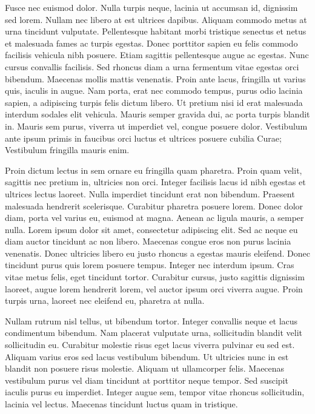 Fusce nec euismod dolor.
Nulla turpis neque, lacinia ut accumsan id, dignissim sed lorem.
Nullam nec libero at est ultrices dapibus.
Aliquam commodo metus at urna tincidunt vulputate.
Pellentesque habitant morbi tristique senectus et netus et malesuada fames ac turpis egestas.
Donec porttitor sapien eu felis commodo facilisis vehicula nibh posuere.
Etiam sagittis pellentesque augue ac egestas.
Nunc cursus convallis facilisis.
Sed rhoncus diam a urna fermentum vitae egestas orci bibendum.
Maecenas mollis mattis venenatis.
Proin ante lacus, fringilla ut varius quis, iaculis in augue.
Nam porta, erat nec commodo tempus, purus odio lacinia sapien, a adipiscing turpis felis dictum libero.
Ut pretium nisi id erat malesuada interdum sodales elit vehicula.
Mauris semper gravida dui, ac porta turpis blandit in.
Mauris sem purus, viverra ut imperdiet vel, congue posuere dolor.
Vestibulum ante ipsum primis in faucibus orci luctus et ultrices posuere cubilia Curae; Vestibulum fringilla mauris enim.

Proin dictum lectus in sem ornare eu fringilla quam pharetra.
Proin quam velit, sagittis nec pretium in, ultricies non orci.
Integer facilisis lacus id nibh egestas et ultrices lectus laoreet.
Nulla imperdiet tincidunt erat non bibendum.
Praesent malesuada hendrerit scelerisque.
Curabitur pharetra posuere lorem.
Donec dolor diam, porta vel varius eu, euismod at magna.
Aenean ac ligula mauris, a semper nulla.
Lorem ipsum dolor sit amet, consectetur adipiscing elit.
Sed ac neque eu diam auctor tincidunt ac non libero.
Maecenas congue eros non purus lacinia venenatis.
Donec ultricies libero eu justo rhoncus a egestas mauris eleifend.
Donec tincidunt purus quis lorem posuere tempus.
Integer nec interdum ipsum.
Cras vitae metus felis, eget tincidunt tortor.
Curabitur cursus, justo sagittis dignissim laoreet, augue lorem hendrerit lorem, vel auctor ipsum orci viverra augue.
Proin turpis urna, laoreet nec eleifend eu, pharetra at nulla.

Nullam rutrum nisl tellus, ut bibendum tortor.
Integer convallis neque et lacus condimentum bibendum.
Nam placerat vulputate urna, sollicitudin blandit velit sollicitudin eu.
Curabitur molestie risus eget lacus viverra pulvinar eu sed est.
Aliquam varius eros sed lacus vestibulum bibendum.
Ut ultricies nunc in est blandit non posuere risus molestie.
Aliquam ut ullamcorper felis.
Maecenas vestibulum purus vel diam tincidunt at porttitor neque tempor.
Sed suscipit iaculis purus eu imperdiet.
Integer augue sem, tempor vitae rhoncus sollicitudin, lacinia vel lectus.
Maecenas tincidunt luctus quam in tristique.

